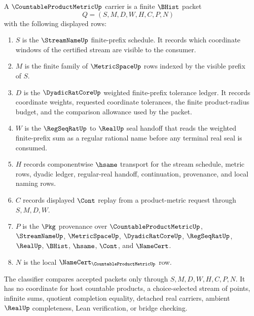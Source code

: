 \begin{definition}
\label{def:countable-product-metric-carrier}
A $\CountableProductMetricUp$ carrier is a finite $\BHist$ packet
$$
Q=(S,M,D,W,H,C,P,N)
$$
with the following displayed rows:
\begin{enumerate}
\item $S$ is the $\StreamNameUp$ finite-prefix schedule. It records which coordinate windows of the certified stream are visible to the consumer.
\item $M$ is the finite family of $\MetricSpaceUp$ rows indexed by the visible prefix of $S$.
\item $D$ is the $\DyadicRatCoreUp$ weighted finite-prefix tolerance ledger. It records coordinate weights, requested coordinate tolerances, the finite product-radius budget, and the comparison allowance used by the packet.
\item $W$ is the $\RegSeqRatUp$ to $\RealUp$ seal handoff that reads the weighted finite-prefix sum as a regular rational name before any terminal real seal is consumed.
\item $H$ records componentwise $\hsame$ transport for the stream schedule, metric rows, dyadic ledger, regular-real handoff, continuation, provenance, and local naming rows.
\item $C$ records displayed $\Cont$ replay from a product-metric request through $S,M,D,W$.
\item $P$ is the $\Pkg$ provenance over $\CountableProductMetricUp$, $\StreamNameUp$, $\MetricSpaceUp$, $\DyadicRatCoreUp$, $\RegSeqRatUp$, $\RealUp$, $\BHist$, $\hsame$, $\Cont$, and $\NameCert$.
\item $N$ is the local $\NameCert_{\CountableProductMetricUp}$ row.
\end{enumerate}
The classifier compares accepted packets only through $S,M,D,W,H,C,P,N$. It has no coordinate for host countable products, a choice-selected stream of points, infinite sums, quotient completion equality, detached real carriers, ambient $\RealUp$ completeness, Lean verification, or bridge checking.
\end{definition}

